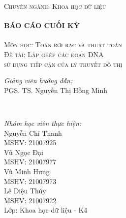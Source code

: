 \documentclass[14pt, a4paper]{article}
\numberwithin{equation}{section}
\numberwithin{figure}{section}
\numberwithin{dl}{section}
\numberwithin{md}{section}
\numberwithin{bd}{section}
\numberwithin{dn}{section}
\numberwithin{hq}{section}
\begin{document}
\begin{titlepage}
        \textsc{\Large Chuyên ngành: Khoa học dữ liệu}\\[0.5cm] %



        \HRule \\[0.4cm]
        { \huge \bfseries BÁO CÁO CUỐI KỲ}\\[0.4cm] %
        \HRule \\[1.5cm]

        \textsc{\Large Môn học: Toán rời rạc và thuật toán}\\[1cm] %


        \textsc{\Large Đề tài: Lắp ghép các đoạn DNA \\ sử dụng tiếp cận của lý thuyết đồ thị}\\[1cm]


        \begin{minipage}{0.4\textwidth}
            \begin{flushleft} \large
            \emph{Giảng viên hướng dẫn:} \\
            PGS. TS. Nguyễn Thị Hồng Minh %
            \end{flushleft}
        \end{minipage}\\[0.5cm]

        \begin{minipage}{0.4\textwidth}
        \begin{flushleft} \large
        \emph{Nhóm học viên thực hiện:}\\
        Nguyễn Chí Thanh \\
        MSHV: 21007925 \\ %
        Vũ Ngọc Đại \\
        MSHV: 21007977 \\
        Vũ Minh Hưng \\
        MSHV: 21007973 \\
        Lê Diệu Thúy \\
        MSHV: 21007922 \\
        Lớp: Khoa học dữ liệu - K4
        \end{flushleft}
        \end{minipage}



\end{titlepage}
\end{document}
